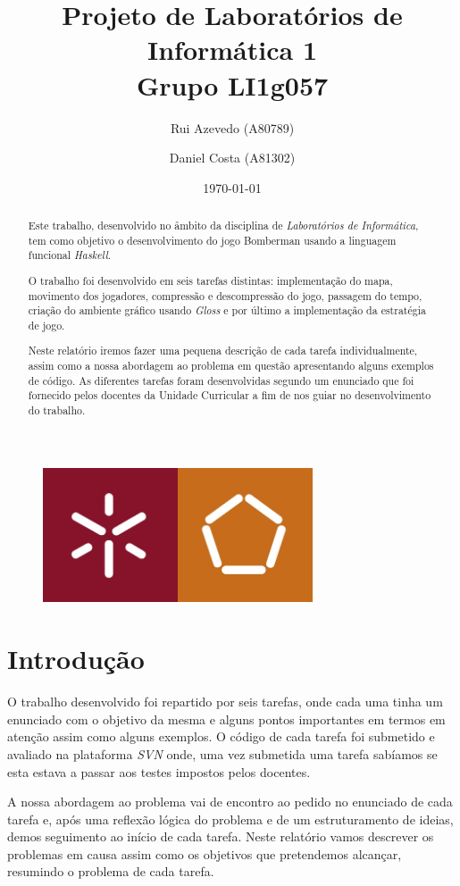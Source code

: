 \documentclass[a4paper]{article}
\title{Projeto de Laboratórios de Informática 1\\Grupo LI1g057}
\author{Rui Azevedo (A80789) \and Daniel Costa (A81302)}
\date{\today}
\begin{document}
\maketitle

\begin{figure}[H]
      \centering
      \includegraphics[width=8cm]{UMINHO.jpg}
\end{figure}

\newpage

\begin{abstract}
\label{sec:Resumo}
Este trabalho, desenvolvido no âmbito da disciplina de \emph{Laboratórios de Informática}, tem como objetivo o desenvolvimento do jogo Bomberman usando a linguagem funcional \emph{Haskell}.\par O trabalho foi desenvolvido em seis tarefas distintas: implementação do mapa, movimento dos jogadores, compressão e descompressão do jogo, passagem do tempo, criação do ambiente gráfico usando \emph{Gloss} e por último a implementação da estratégia de jogo. \par Neste relatório iremos fazer uma pequena descrição de cada tarefa individualmente, assim como a nossa abordagem ao problema em questão apresentando alguns exemplos de código. As diferentes tarefas foram desenvolvidas segundo um enunciado que foi fornecido pelos docentes da Unidade Curricular a fim de nos guiar no desenvolvimento do trabalho.
\end{abstract}

\vspace{1cm}

\tableofcontents

\vspace{1cm}

\section{Introdução}
\label{sec:Intro}
O trabalho desenvolvido foi repartido por seis tarefas, onde cada uma tinha um enunciado com o objetivo da mesma e alguns pontos importantes em termos em atenção assim como alguns exemplos. O código de cada tarefa foi submetido e avaliado na plataforma \emph{SVN} onde, uma vez submetida uma tarefa sabíamos se esta estava a passar aos testes impostos pelos docentes.\par A nossa abordagem ao problema vai de encontro ao pedido no enunciado de cada tarefa e, após uma reflexão lógica do problema e de um estruturamento de ideias, demos seguimento ao início de cada tarefa. Neste relatório vamos descrever os problemas em causa assim como os objetivos que pretendemos alcançar, resumindo o problema de cada tarefa. 
\end{document}
